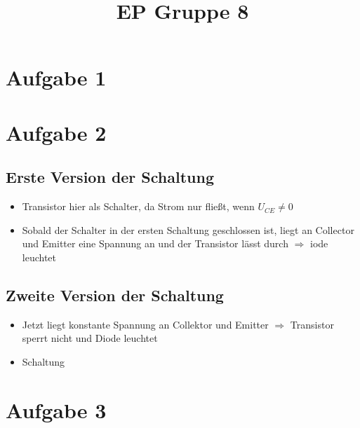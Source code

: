 \documentclass[compress,11pt]{beamer}
\title{EP Gruppe 8}
\begin{document}
\section{Aufgabe 1}
\begin{frame}

\end{frame}


\section{Aufgabe 2}
\begin{frame}
\subsection{Erste Version der Schaltung}
\begin{itemize}
\item Transistor hier als Schalter, da Strom nur fließt, wenn $U_{CE} \neq 0$
\item Sobald der Schalter in der ersten Schaltung geschlossen ist, liegt an Collector und Emitter eine Spannung an und der Transistor lässt durch $\Rightarrow$ iode leuchtet
\end{itemize}
\subsection{Zweite Version der Schaltung}
\begin{itemize}
\item Jetzt liegt konstante Spannung an Collektor und Emitter $\Rightarrow$ Transistor sperrt nicht und Diode leuchtet
\item Schaltung
\end{itemize}
\end{frame}













\section{Aufgabe 3}
\end{document}
